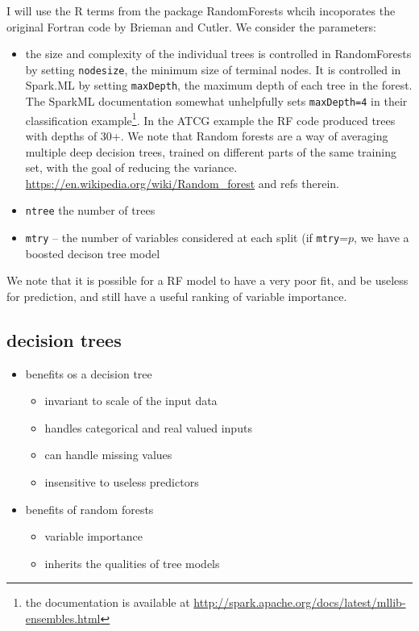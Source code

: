 \documentclass[10pt,letterpaper]{article}
\begin{document}
I will use the R terms from the package RandomForests whcih incoporates the original Fortran code by Brieman and
Cutler. We consider the parameters:
\begin{itemize}
\item the size and complexity of the individual trees is controlled in RandomForests by setting \texttt{nodesize}, the
  minimum size of terminal nodes. It is controlled in Spark.ML by setting \texttt{maxDepth}, the maximum depth of each
  tree in the forest. The SparkML documentation somewhat unhelpfully sets \texttt{maxDepth=4} in their classification
  example\footnote{the documentation is available at \url{http://spark.apache.org/docs/latest/mllib-ensembles.html} }.
  In the ATCG example the RF code produced trees with depths of 30+. We note that Random forests are a way of averaging
  multiple deep decision trees, trained on different parts of the same training set, with the goal of reducing the
  variance. \url{https://en.wikipedia.org/wiki/Random_forest} and refs therein.  
\item \texttt{ntree} the number of trees 
\item \texttt{mtry} --  the number of variables considered at each split (if \texttt{mtry}=$p$, we have a boosted decison
  tree model 
\end{itemize}

We note that it is possible for a RF model to have a very poor fit, and be useless for prediction, and still have a 
useful ranking of variable importance.

\subsection*{decision trees }
\begin{itemize}
\item benefits os a decision tree
  \begin{itemize}
  \item invariant to scale of the input data
  \item handles categorical and real valued inputs 
  \item can handle missing values 
  \item insensitive to useless predictors
  \end{itemize}
\item benefits of random forests
  \begin{itemize}
  \item variable importance 
  \item inherits the qualities of tree models
  \end{itemize}
\end{itemize}
\end{document}
